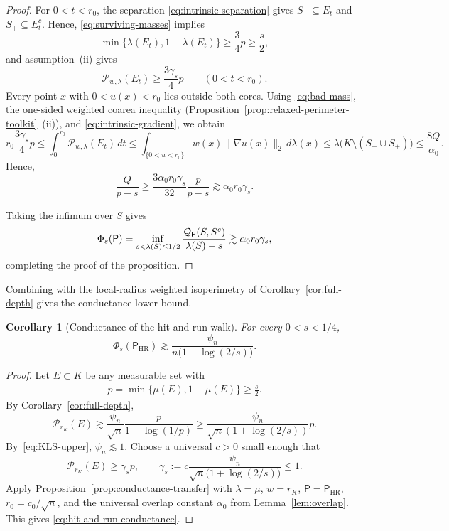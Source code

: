 \documentclass[11pt]{article}
\newtheorem{corollary}[theorem]{Corollary}
\theoremstyle{definition}
\theoremstyle{remark}
\newcommand{\cP}{\mathcal P}
\newcommand{\cQ}{\mathcal Q}
\newcommand{\HR}{\mathsf P_{\mathrm{HR}}}
\newcommand{\rK}{r_K}
\begin{document}
\begin{proof}
For $0<t<r_0$, the separation
\eqref{eq:intrinsic-separation} gives
$S_-\subseteq E_t$ and $S_+\subseteq E_t^c$.  Hence, \eqref{eq:surviving-masses} implies
\[
 \min\{\lambda(E_t),1-\lambda(E_t)\}
 \ge\frac{3}{4}p
 \ge\frac{s}{2},
\]
and assumption~\textup{(ii)} gives
\begin{equation}\label{eq:P_rK_lower_bound}
 \cP_{w,\lambda}(E_t)\ge\frac{3\gamma_s}{4}p
 \qquad(0<t<r_0).
\end{equation}
Every point $x$ with $0<u(x)<r_0$ lies outside both cores.  Using
\eqref{eq:bad-mass}, the one-sided weighted coarea inequality (Proposition~\ref{prop:relaxed-perimeter-toolkit}~\textup{(ii)}), and
\eqref{eq:intrinsic-gradient}, we obtain
\[
 r_0\frac{3\gamma_s}{4}p
 \le
 \int_0^{r_0}\cP_{w,\lambda}(E_t)\,dt
 \le
 \int_{\{0<u<r_0\}}
 w(x)\|\nabla u(x)\|_2\,d\lambda(x)
 \le
 \lambda\bigl(K\setminus(S_-\cup S_+)\bigr)
 \le
 \frac{8Q}{\alpha_0}.
\]
Hence,
\[
 \frac{Q}{p-s}
 \ge
 \frac{3\alpha_0r_0\gamma_s }{32}
 \frac{p}{p-s}
 \gtrsim
 \alpha_0r_0\gamma_s.
\]

Taking the infimum over $S$ gives
\begin{align*}
    \Phi_s({\sf P})=\inf_{s<\lambda(S)\le1/2}
 \frac{
   \cQ_{{\sf P}}(S,S^c)
 }{
   \lambda(S)-s
 }\gtrsim\alpha_0r_0\gamma_s,
\end{align*}
completing the proof of the proposition.
\end{proof}

Combining with the local-radius weighted isoperimetry
of Corollary~\ref{cor:full-depth} gives the conductance lower bound.

\begin{corollary}[Conductance of the hit-and-run walk]
\label{cor:hit-and-run-conductance}
For every $0<s<1/4$,
\begin{equation}\label{eq:hit-and-run-conductance}
 \Phi_s(\HR)
 \gtrsim
 \frac{\psi_n}{n\bigl(1+\log(2/s)\bigr)}.
\end{equation}
\end{corollary}

\begin{proof}
Let $E\subset K$ be any measurable set with 
\begin{align*}
    p=\min\{\mu(E),1-\mu(E)\}\geq \frac{s}{2}.
\end{align*}
By Corollary~\ref{cor:full-depth},
\[
 \cP_{\rK}(E)
 \gtrsim
 \frac{\psi_n}{\sqrt n}
 \frac{p}{1+\log(1/p)}\ge \frac{\psi_n}{\sqrt n(1+\log(2/s))}p.
\]
By~\eqref{eq:KLS-upper}, $\psi_n\lesssim 1$. Choose a universal $c>0$ small enough that
\[
\cP_{\rK}(E)\geq \gamma_s p,\qquad
 \gamma_s
 :=c\frac{\psi_n}{\sqrt n\bigl(1+\log(2/s)\bigr)}\leq 1.
\]
Apply Proposition~\ref{prop:conductance-transfer} with $\lambda=\mu$, $w=\rK$, $\mathsf P=\HR$, $r_0=c_0/\sqrt n$, and the universal overlap constant $\alpha_0$ from Lemma~\ref{lem:overlap}. This gives \eqref{eq:hit-and-run-conductance}.
\end{proof}
\end{document}

